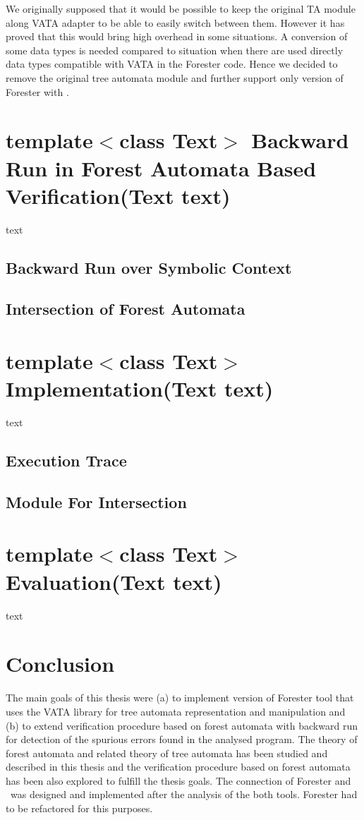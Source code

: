 We originally supposed that it would be possible to keep the original TA module along VATA adapter
to be able to easily switch between them.
However it has proved that this would bring high overhead in some situations.
A conversion of some data types is needed compared to situation when there are used directly data types compatible with VATA in the Forester code.
Hence we decided to remove the original tree automata module and further support only version of Forester with \vata.

\chapter{template$<$class Text$>$ Backward Run in Forest Automata Based Verification(Text text)}
\label{ch:backward}
text

\section{Backward Run over Symbolic Context}

\section{Intersection of Forest Automata}

\chapter{template$<$class Text$>$ Implementation(Text text)}
\label{ch:impl}
text

\section{Execution Trace}
\section{Module For Intersection}

\chapter{template$<$class Text$>$ Evaluation(Text text)}
\label{ch:eval}
text

\chapter{Conclusion}
\label{ch:concl}

The main goals of this thesis were (a) to implement version of Forester tool that uses the VATA library for tree automata representation and manipulation
and (b) to extend verification procedure based on forest automata with backward run for detection of the spurious errors found in the analysed program.
The theory of forest automata and related theory of tree automata has been studied and described in this thesis and the verification procedure
based on forest automata has been also explored to fulfill the thesis goals.
The connection of Forester and \vata\ was designed and implemented after the analysis of the both tools.
Forester had to be refactored for this purposes.

